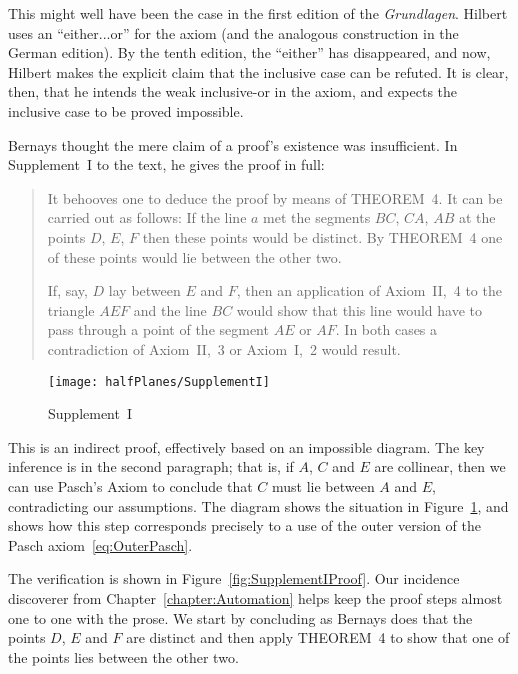 This might well have been the case in the first edition of the \emph{Grundlagen}. Hilbert uses an ``either...or'' for the axiom (and the analogous construction in the German edition). By the tenth edition, the ``either'' has disappeared, and now, Hilbert makes the explicit claim that the inclusive case can be refuted. It is clear, then, that he intends the weak inclusive-or in the axiom, and expects the inclusive case to be proved impossible.

Bernays thought the mere claim of a proof's existence was insufficient. In Supplement~I to the text, he gives the proof in full:

\begin{quotation}\label{sec:SupplementI}
It behooves one to deduce the proof by means of THEOREM~4. It can be carried out as follows: If the line $a$ met the segments $BC$, $CA$, $AB$ at the points $D$, $E$, $F$ then these points would be distinct. By THEOREM~4 one of these points would lie between the other two.

If, say, $D$ lay between $E$ and $F$, then an application of Axiom~II,~4 to the triangle $AEF$ and the line $BC$ would show that this line would have to pass through a point of the segment $AE$ or $AF$. In both cases a contradiction of Axiom~II,~3 or Axiom~I,~2 would result.
\end{quotation}

\begin{figure}
  \centering\texttt{[image: halfPlanes/SupplementI]}
  \caption{Supplement~I}
  \label{fig:SupplementI}
\end{figure}

This is an indirect proof, effectively based on an impossible diagram. The key inference is in the second paragraph; that is, if $A$, $C$ and $E$ are collinear, then we can use Pasch's Axiom to conclude that $C$ must lie between $A$ and $E$, contradicting our assumptions. The diagram shows the situation in Figure~\ref{fig:SupplementI}, and shows how this step corresponds precisely to a use of the outer version of the Pasch axiom~\eqref{eq:OuterPasch}.

The verification is shown in Figure~\ref{fig:SupplementIProof}. Our incidence discoverer from Chapter~\ref{chapter:Automation} helps keep the proof steps almost one to one with the prose. We start by concluding as Bernays does that the points $D$, $E$ and $F$ are distinct and then apply THEOREM~4 to show that one of the points lies between the other two.

